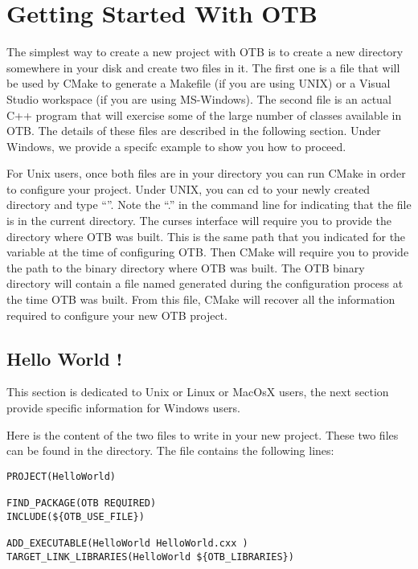\section{Getting Started With OTB }
\label{sec:GettingStartedWithOTB}

The simplest way to create a new project with OTB is to create a new directory somewhere in your disk and create two files in it. The first one is a  file that will be used by CMake to generate a Makefile (if you are using UNIX) or a Visual Studio workspace (if you are using MS-Windows).  The second file is an actual C++ program that will exercise some of the large number of classes available in OTB. The details of these files are described in the following section. Under Windows, we provide a specifc example to show you how to proceed.  

For Unix users, once both files are in your directory you can run CMake in order to configure your project. Under UNIX, you can cd to your newly created directory and type ``''. Note the ``.'' in the command line for indicating that the  file is in the current directory. The curses interface will require you to provide the directory where OTB was built. This is the same path that you indicated for the  variable at the time of configuring OTB. Then CMake will require you to provide the path to the binary directory where OTB was built. The OTB binary directory will contain a file named  generated during the configuration process at the time OTB was built.  From this file, CMake will recover all the information required to configure your new OTB project.


\subsection{Hello World !}
\label{sec:HelloWorldOTB}

This section is dedicated to Unix or Linux or MacOsX users, the next section provide specific information for Windows users.


Here is the content of the two files to write in your new project. These two files can be found in the  directory. The  file contains the following lines:

\small
\begin{verbatim}
PROJECT(HelloWorld)

FIND_PACKAGE(OTB REQUIRED)
INCLUDE(${OTB_USE_FILE})

ADD_EXECUTABLE(HelloWorld HelloWorld.cxx )
TARGET_LINK_LIBRARIES(HelloWorld ${OTB_LIBRARIES})
\end{verbatim}

